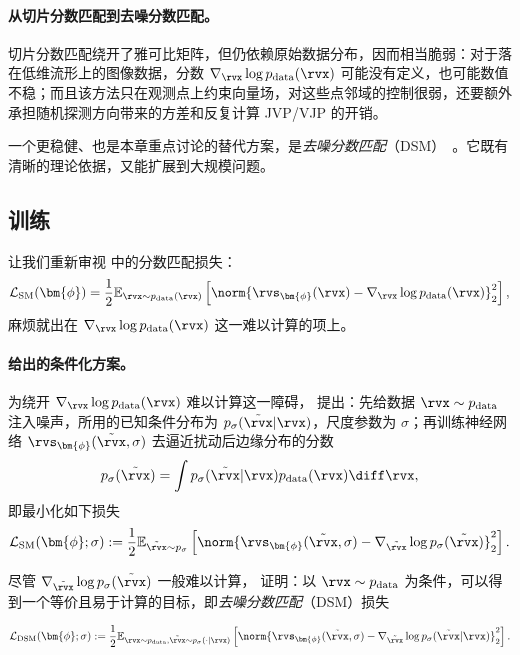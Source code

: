 \paragraph{从切片分数匹配到去噪分数匹配。} 切片分数匹配绕开了雅可比矩阵，但仍依赖原始数据分布，因而相当脆弱：对于落在低维流形上的图像数据，分数 $\nabla_{\rvx}\log p_{\mathrm{data}}(\rvx)$ 可能没有定义，也可能数值不稳；而且该方法只在观测点上约束向量场，对这些点邻域的控制很弱，还要额外承担随机探测方向带来的方差和反复计算 JVP/VJP 的开销。

一个更稳健、也是本章重点讨论的替代方案，是\emph{去噪分数匹配}（DSM）~\citep{vincent2011connection}。它既有清晰的理论依据，又能扩展到大规模问题。

\subsection{训练}
让我们重新审视  中的分数匹配损失：
\begin{align*}
     \mathcal{L}_{\text{SM}}(\bm{\phi}) =  \frac{1}{2} \mathbb{E}_{\rvx \sim p_{\text{data}}(\rvx)} \left[ \norm{\rvs_{\bm{\phi}}(\rvx) - \nabla_{\rvx} \log p_{\text{data}}(\rvx)}_2^2 \right],
\end{align*}
麻烦就出在 $\nabla_{\rvx} \log p_{\text{data}}(\rvx)$ 这一难以计算的项上。

\paragraph{\citet{vincent2011connection} 给出的条件化方案。}
为绕开 $\nabla_{\rvx} \log p_{\text{data}}(\rvx)$ 难以计算这一障碍，\citet{vincent2011connection} 提出：先给数据 $\rvx \sim p_{\text{data}}$ 注入噪声，所用的已知条件分布为 $p_{\sigma}(\tilde{\rvx}|\rvx)$，尺度参数为 $\sigma$；再训练神经网络 $\rvs_{\bm{\phi}}(\tilde{\rvx}, \sigma)$ 去逼近扰动后边缘分布的分数
\[
p_\sigma(\tilde{\rvx}) = \int p_{\sigma}(\tilde{\rvx}|\rvx) p_{\text{data}}(\rvx) \diff \rvx,
\]
即最小化如下损失
\begin{align}\label{eq:sm-noise-loss}
\mathcal{L}_{\text{SM}}(\bm{\phi}; \sigma) := \frac{1}{2} \mathbb{E}_{\tilde{\rvx} \sim p_\sigma} \left[ \norm{\rvs_{\bm{\phi}}(\tilde{\rvx}, \sigma) - \nabla_{\tilde{\rvx}} \log p_\sigma(\tilde{\rvx})}_2^2 \right].
\end{align}

尽管 $\nabla_{\tilde{\rvx}} \log p_\sigma(\tilde{\rvx})$ 一般难以计算，\citet{vincent2011connection} 证明：以 $\rvx \sim p_{\text{data}}$ 为条件，可以得到一个等价且易于计算的目标，即\emph{去噪分数匹配}（DSM）损失
\begin{mdframed}
\begin{align}\label{eq:dsm-loss}
\mathcal{L}_{\text{DSM}}(\bm{\phi}; \sigma) := \frac{1}{2} \mathbb{E}_{\rvx \sim p_{\text{data}}, \tilde{\rvx} \sim p_{\sigma}(\cdot|\rvx)} \left[ \norm{\rvs_{\bm{\phi}}(\tilde{\rvx}, \sigma) - \nabla_{\tilde{\rvx}} \log p_{\sigma}(\tilde{\rvx}|\rvx)}_2^2 \right].
\end{align}
\end{mdframed}

